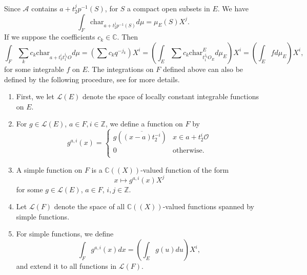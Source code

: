 \documentclass{amsart}
\theoremstyle{definition}
\theoremstyle{remark}
\numberwithin{equation}{section}
\def  \Char     {\mathrm{char}}
\def  \ca       {\mathcal{A}}
\def  \cl       {\mathcal{L}}
\def  \co       {\mathcal{O}}
\def  \bc       {\mathbb{C}}
\def  \bz       {\mathbb{Z}}
\begin{document}
Since $\ca$ contains $a+t_2^jp^{-1}(S)$, for $S$ a compact open subsets in $E$. We have
$$
\int_F  \Char_{a+t_2^jp^{-1}(S)}  d  \mu = \mu_E(S)  X^j.
$$
If we suppose the coefficients $c_k \in  \bc$.
 Then  
 $$
 \int_F  \sum_k   c_k   \Char_{a+  t_2^i t_1^{j_k} O}   d \mu =  \left(\sum c_k  q^{-j_k}  \right) X^i    = \left( \int_E \sum c_k \Char^{E}_{t_1^{j_k} O_E }  d \mu_E \right)X^i=  \left(\int_E f d\mu_E\right) X^i,
  $$
for some integrable $f$  on $E$. The integrations on $F$ defined above can also be
defined by the following procedure,  see  \cite{morrow2010integration} for more details.
\begin{enumerate}
	\item  First, we let $\cl(E)$ denote the space of locally constant integrable functions  on $E$. 
	\item   For $g \in \cl(E)$, $a \in F,   i \in \bz$,   we  define a  function on $F$ by
	$$
	 g^{a, i }(x) = \left \{
	 \begin{array}{ll}
	 g( \overline{(x-a)t_2^{-i}} )  &  x \in a + t_2^i \co  \\
	 0    &  \text{otherwise}.   \\
	 \end{array} 
	 \right.
	$$
	\item   A simple function on $F$ is a $\bc((X))$-valued function of the form
	$$
	x \mapsto g^{a,i }(x) X^{j} 
	$$
	for some $g \in \cl(E)$, $a \in F$, $ i, j \in \bz$.
	\item  Let $\cl(F)$ denote the space of all $\bc((X))$-valued functions spanned by simple functions. 
	\item   For simple functions,  we define
	$$
	\int_F g^{a,i}(x)  dx=  \left(\int_ E g(u) du \right) X^i,
	$$
and extend it to all functions in $\cl(F)$.
\end{enumerate}
\end{document}
